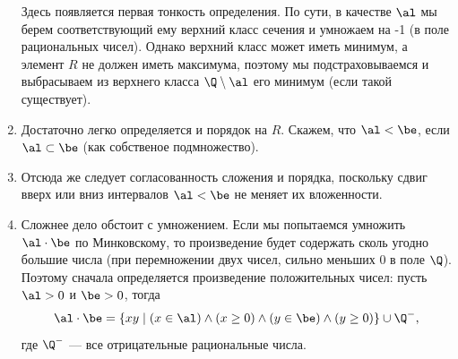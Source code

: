\begin{enumerate}
Здесь появляется первая тонкость определения. По сути, в качестве $\al$ мы берем соответствующий ему верхний класс сечения и умножаем на -1 (в поле рациональных чисел). Однако верхний класс может иметь минимум, а элемент $R$ не должен иметь максимума, поэтому мы подстраховываемся и выбрасываем из верхнего класса $\Q\setminus\al$ его минимум (если такой существует).

\item Достаточно легко определяется и порядок на $R$. Скажем, что $\al<\be$, если $\al\subset\be$ (как собственое подмножество).
\item Отсюда же следует согласованность сложения и порядка, поскольку сдвиг вверх или вниз интервалов $\al<\be$ не меняет их вложенности.
\item Сложнее дело обстоит с умножением. Если мы попытаемся умножить $\al\cdot\be$ по Минковскому, то произведение будет содержать сколь угодно большие числа (при перемножении двух чисел, сильно меньших 0 в поле $\Q$). Поэтому сначала определяется произведение положительных чисел: пусть $\al>0$ и $\be>0$, тогда
$$
\al\cdot\be = \{xy\mid (x\in\al)\land(x\ge 0)\land(y\in\be)\land(y\ge 0)\}\cup\Q^-,
$$
где $\Q^-$ --- все отрицательные рациональные числа.


\end{enumerate}
